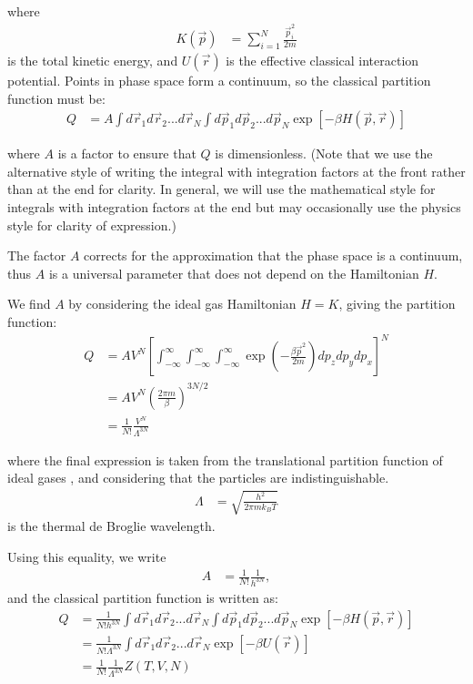 \documentclass[book.tex]{subfiles}
\begin{document}
\noindent where 
\begin{align}
K(\vec{p}) &= \sum_{i=1}^N\frac{\vec{p}_i^2}{2m}
\end{align}
is the total kinetic energy, and $U(\vec{r})$ is the effective classical interaction potential. Points in phase space form a continuum, so the classical partition function must be:
\begin{align}
Q &= A\int d\vec{r}_1d\vec{r}_2...d\vec{r}_N  \int d\vec{p}_1d\vec{p}_2...d\vec{p}_N   \exp\left[-\beta H(\vec{p},\vec{r})\right] 
\end{align}

\noindent where $A$ is a factor to ensure that $Q$ is dimensionless. (Note that we use the alternative style of writing the integral with integration factors at the front rather than at the end for clarity. In general, we will use the mathematical style for integrals with integration factors at the end but may occasionally use the physics style for clarity of expression.)

The factor $A$ corrects for the approximation that the phase space is a continuum, thus $A$ is a universal parameter that does not depend on the Hamiltonian $H$.

We find $A$ by considering the ideal gas Hamiltonian $H = K$, giving the partition function:
\begin{align}
Q &= AV^N\left[\int_{-\infty}^\infty  \int_{-\infty}^\infty \int_{-\infty}^\infty  \exp \left(-\frac{\beta\vec{p}^ 2}{2m}\right) dp_z dp_y dp_x \right]^N\\
&= AV^N\left(\frac{2\pi m}{\beta}\right)^{3N/2} \\ 
&= \frac{1}{N!}\frac{V^N}{\Lambda^{3N}} 
\end{align}

\noindent where the final expression is taken from the translational partition function of ideal gases , and considering that the particles are indistinguishable. 
\begin{align}
\Lambda &= \sqrt{\frac{h^2}{2\pi mk_B T}}
\end{align} 
is the thermal de Broglie wavelength.

Using this equality, we write 
\begin{align}
A &= \frac{1}{N!}\frac{1}{h^{3N}},
\end{align}
and the classical partition function is written as:
\begin{align}
Q &= \frac{1}{N!h^{3N}}\int d\vec{r}_1d\vec{r}_2...d\vec{r}_N \int d\vec{p}_1d\vec{p}_2...d\vec{p}_N \exp\left[-\beta H(\vec{p},\vec{r})\right] \\ 
&= \frac{1}{N!\Lambda^{3N}}\int d\vec{r}_1d\vec{r}_2...d\vec{r}_N \exp[-\beta U(\vec{r})]  \\
&= \frac{1}{N!}\frac{1}{\Lambda^{3N}}Z(T,V,N)  
\end{align}
\end{document}
